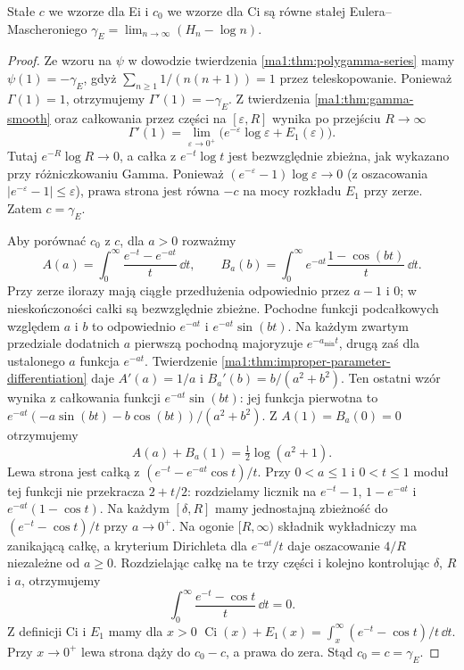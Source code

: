 \begin{twierdzenie}
\label{ma1:thm:ei-ci-euler-constant}
Stałe $c$ we wzorze dla Ei i $c_0$ we wzorze
dla Ci są równe stałej Eulera--Mascheroniego
$\gamma_{\!E}=\lim_{n\to\infty}(H_n-\log n)$.
\end{twierdzenie}
\begin{proof}
Ze wzoru na $\psi$ w dowodzie twierdzenia
\ref{ma1:thm:polygamma-series} mamy
$\psi(1)=-\gamma_{\!E}$, gdyż
$\sum_{n\ge1}1/(n(n+1))=1$ przez teleskopowanie.
Ponieważ $\Gamma(1)=1$, otrzymujemy
$\Gamma'(1)=-\gamma_{\!E}$.
Z twierdzenia \ref{ma1:thm:gamma-smooth}
oraz całkowania przez części na $[\varepsilon,R]$
wynika po przejściu $R\to\infty$
\[
 \Gamma'(1)=\lim_{\varepsilon\to0^+}
 \bigl(e^{-\varepsilon}\log\varepsilon+E_1(\varepsilon)\bigr).
\]
Tutaj $e^{-R}\log R\to0$, a całka z
$e^{-t}\log t$ jest bezwzględnie zbieżna,
jak wykazano przy różniczkowaniu Gamma.
Ponieważ $(e^{-\varepsilon}-1)\log\varepsilon\to0$
(z oszacowania $|e^{-\varepsilon}-1|\le\varepsilon$),
prawa strona jest równa $-c$ na mocy
rozkładu $E_1$ przy zerze. Zatem $c=\gamma_{\!E}$.

Aby porównać $c_0$ z $c$, dla $a>0$ rozważmy
\[
 A(a)=\int_0^\infty\frac{e^{-t}-e^{-at}}t\,\dd t,
 \qquad
 B_a(b)=\int_0^\infty
           e^{-at}\frac{1-\cos(bt)}t\,\dd t.
\]
Przy zerze ilorazy mają ciągłe przedłużenia
odpowiednio przez $a-1$ i $0$; w nieskończoności
całki są bezwzględnie zbieżne. Pochodne funkcji
podcałkowych względem $a$ i $b$ to odpowiednio
$e^{-at}$ i $e^{-at}\sin(bt)$. Na każdym zwartym
przedziale dodatnich $a$ pierwszą pochodną
majoryzuje $e^{-a_{\min}t}$, drugą zaś dla
ustalonego $a$ funkcja $e^{-at}$.
Twierdzenie \ref{ma1:thm:improper-parameter-differentiation}
daje $A'(a)=1/a$ i
$B_a'(b)=b/(a^2+b^2)$. Ten ostatni wzór wynika
z całkowania funkcji $e^{-at}\sin(bt)$:
jej funkcja pierwotna to
$e^{-at}(-a\sin(bt)-b\cos(bt))/(a^2+b^2)$.
Z $A(1)=B_a(0)=0$ otrzymujemy
\[
 A(a)+B_a(1)=\tfrac12\log(a^2+1).
\]
Lewa strona jest całką z
$(e^{-t}-e^{-at}\cos t)/t$.
Przy $0<a\le1$ i $0<t\le1$ moduł tej funkcji
nie przekracza $2+t/2$: rozdzielamy licznik
na $e^{-t}-1$, $1-e^{-at}$ i $e^{-at}(1-\cos t)$.
Na każdym $[\delta,R]$ mamy jednostajną
zbieżność do $(e^{-t}-\cos t)/t$ przy $a\to0^+$.
Na ogonie $[R,\infty)$ składnik wykładniczy
ma zanikającą całkę, a kryterium Dirichleta
dla $e^{-at}/t$ daje oszacowanie $4/R$
niezależne od $a\ge0$. Rozdzielając całkę
na te trzy części i kolejno kontrolując
$\delta$, $R$ i $a$, otrzymujemy
\[
 \int_0^\infty\frac{e^{-t}-\cos t}{t}\,\dd t=0.
\]
Z definicji Ci i $E_1$ mamy dla $x>0$
$\operatorname{Ci}(x)+E_1(x)=
\int_x^\infty(e^{-t}-\cos t)/t\,\dd t$.
Przy $x\to0^+$ lewa strona dąży do $c_0-c$,
a prawa do zera. Stąd $c_0=c=\gamma_{\!E}$.
\end{proof}

